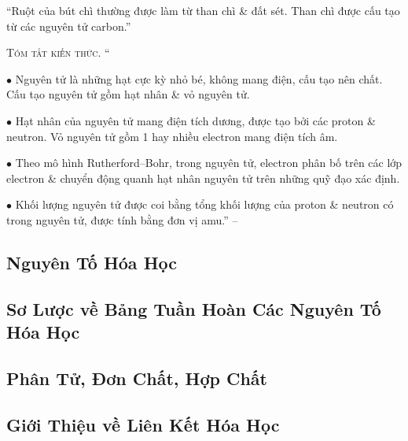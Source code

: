 \documentclass{article}
\numberwithin{equation}{section}
\begin{document}
``Ruột của bút chì thường được làm từ than chì \& đất sét. Than chì được cấu tạo từ các nguyên tử carbon.''
\vspace{2mm}

\noindent\textsc{Tóm tắt kiến thức.}
``\begin{enumerate*}
	\item[$\bullet$] Nguyên tử là những hạt cực kỳ nhỏ bé, không mang điện, cấu tạo nên chất. Cấu tạo nguyên tử gồm hạt nhân \& vỏ nguyên tử.
	\item[$\bullet$] Hạt nhân của nguyên tử mang điện tích dương, được tạo bởi các proton \& neutron. Vỏ nguyên tử gồm 1 hay nhiều electron mang điện tích âm.
	\item[$\bullet$] Theo mô hình Rutherford--Bohr, trong nguyên tử, electron phân bố trên các lớp electron \& chuyển động quanh hạt nhân nguyên tử trên những quỹ đạo xác định.
	\item[$\bullet$] Khối lượng nguyên tử được coi bằng tổng khối lượng của proton \& neutron có trong nguyên tử, được tính bằng đơn vị amu.'' -- \cite[p. 14]{SGK_KHTN_7_Canh_Dieu}
\end{enumerate*}


\subsection{Nguyên Tố Hóa Học}


\subsection{Sơ Lược về Bảng Tuần Hoàn Các Nguyên Tố Hóa Học}


\subsection{Phân Tử, Đơn Chất, Hợp Chất}


\subsection{Giới Thiệu về Liên Kết Hóa Học}
\end{document}
